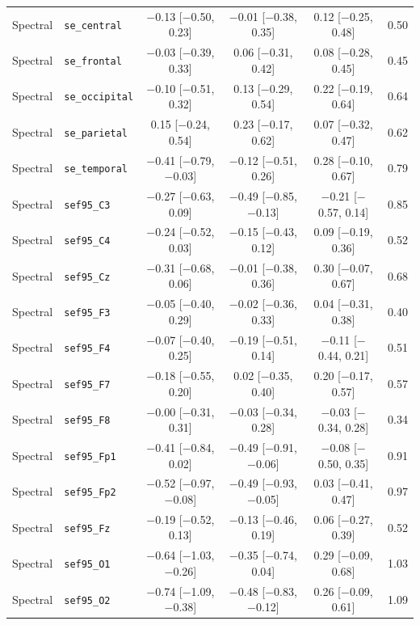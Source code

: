 {\begin{longtable}{llcccc}
Spectral & \texttt{se\_central} & $-$0.13 [$-$0.50, 0.23] & $-$0.01 [$-$0.38, 0.35] & 0.12 [$-$0.25, 0.48] & 0.50 \\
Spectral & \texttt{se\_frontal} & $-$0.03 [$-$0.39, 0.33] & 0.06 [$-$0.31, 0.42] & 0.08 [$-$0.28, 0.45] & 0.45 \\
Spectral & \texttt{se\_occipital} & $-$0.10 [$-$0.51, 0.32] & 0.13 [$-$0.29, 0.54] & 0.22 [$-$0.19, 0.64] & 0.64 \\
Spectral & \texttt{se\_parietal} & 0.15 [$-$0.24, 0.54] & 0.23 [$-$0.17, 0.62] & 0.07 [$-$0.32, 0.47] & 0.62 \\
Spectral & \texttt{se\_temporal} & $-$0.41 [$-$0.79, $-$0.03] & $-$0.12 [$-$0.51, 0.26] & 0.28 [$-$0.10, 0.67] & 0.79 \\
Spectral & \texttt{sef95\_C3} & $-$0.27 [$-$0.63, 0.09] & $-$0.49 [$-$0.85, $-$0.13] & $-$0.21 [$-$0.57, 0.14] & 0.85 \\
Spectral & \texttt{sef95\_C4} & $-$0.24 [$-$0.52, 0.03] & $-$0.15 [$-$0.43, 0.12] & 0.09 [$-$0.19, 0.36] & 0.52 \\
Spectral & \texttt{sef95\_Cz} & $-$0.31 [$-$0.68, 0.06] & $-$0.01 [$-$0.38, 0.36] & 0.30 [$-$0.07, 0.67] & 0.68 \\
Spectral & \texttt{sef95\_F3} & $-$0.05 [$-$0.40, 0.29] & $-$0.02 [$-$0.36, 0.33] & 0.04 [$-$0.31, 0.38] & 0.40 \\
Spectral & \texttt{sef95\_F4} & $-$0.07 [$-$0.40, 0.25] & $-$0.19 [$-$0.51, 0.14] & $-$0.11 [$-$0.44, 0.21] & 0.51 \\
Spectral & \texttt{sef95\_F7} & $-$0.18 [$-$0.55, 0.20] & 0.02 [$-$0.35, 0.40] & 0.20 [$-$0.17, 0.57] & 0.57 \\
Spectral & \texttt{sef95\_F8} & $-$0.00 [$-$0.31, 0.31] & $-$0.03 [$-$0.34, 0.28] & $-$0.03 [$-$0.34, 0.28] & 0.34 \\
Spectral & \texttt{sef95\_Fp1} & $-$0.41 [$-$0.84, 0.02] & $-$0.49 [$-$0.91, $-$0.06] & $-$0.08 [$-$0.50, 0.35] & 0.91 \\
Spectral & \texttt{sef95\_Fp2} & $-$0.52 [$-$0.97, $-$0.08] & $-$0.49 [$-$0.93, $-$0.05] & 0.03 [$-$0.41, 0.47] & 0.97 \\
Spectral & \texttt{sef95\_Fz} & $-$0.19 [$-$0.52, 0.13] & $-$0.13 [$-$0.46, 0.19] & 0.06 [$-$0.27, 0.39] & 0.52 \\
Spectral & \texttt{sef95\_O1} & $-$0.64 [$-$1.03, $-$0.26] & $-$0.35 [$-$0.74, 0.04] & 0.29 [$-$0.09, 0.68] & 1.03 \\
Spectral & \texttt{sef95\_O2} & $-$0.74 [$-$1.09, $-$0.38] & $-$0.48 [$-$0.83, $-$0.12] & 0.26 [$-$0.09, 0.61] & 1.09 \\

\end{longtable}}
